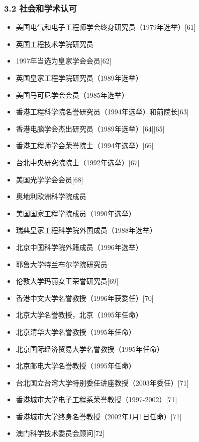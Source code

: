 \subsubsection{3.2 社会和学术认可}
\begin{itemize}
\item 美国电气和电子工程师学会终身研究员（1979年选举）[61]
\item 英国工程技术学院研究员
\item 1997年当选为皇家学会会员[62]
\item 英国皇家工程学院研究员（1989年选举）
\item 美国马可尼学会会员（1985年选举）
\item 香港工程科学院名誉研究员（1994年选举）和前院长[63]
\item 香港电脑学会杰出研究员（1989年选举）[64][65]
\item 香港工程师学会荣誉院士（1994年选举）[66]
\item 台北中央研究院院士（1992年选举）[67]
\item 美国光学学会会员[68]
\item 奥地利欧洲科学院成员
\item 美国国家工程学院成员（1990年选举）
\item 瑞典皇家工程科学院外国成员（1988年选举）
\item 北京中国科学院外籍成员（1996年选举）
\item 耶鲁大学特兰布尔学院研究员
\item 伦敦大学玛丽女王荣誉研究员[69]
\item 香港中文大学名誉教授（1996年获委任）[70]
\item 北京大学名誉教授，北京（1995年任命）
\item 北京清华大学名誉教授（1995年任命）
\item 北京国际经济贸易大学名誉教授（1995年任命）
\item 北京邮电大学名誉教授（1995年任命）
\item 台北国立台湾大学特别委任讲座教授（2003年委任）[71]
\item 香港城市大学电子工程系荣誉教授（1997-2002）[71]
\item 香港城市大学终身名誉教授（2002年1月1日任命）[71]
\item 澳门科学技术委员会顾问[72]
\end{itemize}

